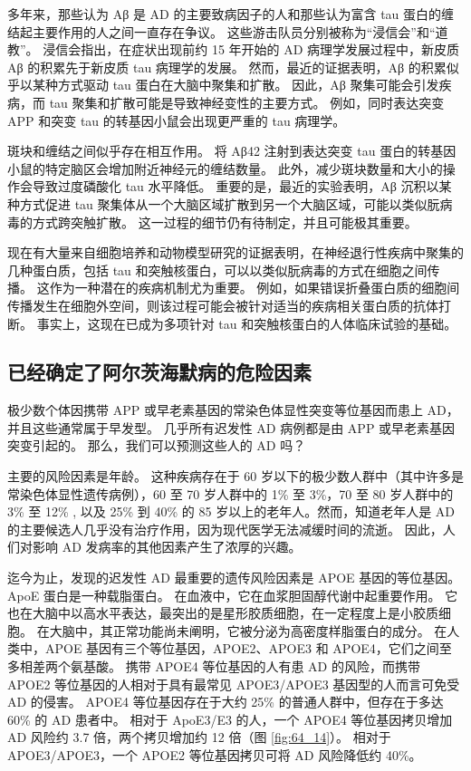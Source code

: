 多年来，那些认为 Aβ 是 AD 的主要致病因子的人和那些认为富含 tau 蛋白的缠结起主要作用的人之间一直存在争议。
这些游击队员分别被称为“浸信会”和“道教”。
浸信会指出，在症状出现前约 15 年开始的 AD 病理学发展过程中，新皮质 Aβ 的积累先于新皮质 tau 病理学的发展。
然而，最近的证据表明，Aβ 的积累似乎以某种方式驱动 tau 蛋白在大脑中聚集和扩散。
因此，Aβ 聚集可能会引发疾病，而 tau 聚集和扩散可能是导致神经变性的主要方式。
例如，同时表达突变 APP 和突变 tau 的转基因小鼠会出现更严重的 tau 病理学。


斑块和缠结之间似乎存在相互作用。
将 Aβ42 注射到表达突变 tau 蛋白的转基因小鼠的特定脑区会增加附近神经元的缠结数量。
此外，减少斑块数量和大小的操作会导致过度磷酸化 tau 水平降低。
重要的是，最近的实验表明，Aβ 沉积以某种方式促进 tau 聚集体从一个大脑区域扩散到另一个大脑区域，可能以类似朊病毒的方式跨突触扩散。
这一过程的细节仍有待制定，并且可能极其重要。


现在有大量来自细胞培养和动物模型研究的证据表明，在神经退行性疾病中聚集的几种蛋白质，包括 tau 和突触核蛋白，可以以类似朊病毒的方式在细胞之间传播。
这作为一种潜在的疾病机制尤为重要。
例如，如果错误折叠蛋白质的细胞间传播发生在细胞外空间，则该过程可能会被针对适当的疾病相关蛋白质的抗体打断。
事实上，这现在已成为多项针对 tau 和突触核蛋白的人体临床试验的基础。



\subsection{已经确定了阿尔茨海默病的危险因素}

极少数个体因携带 APP 或早老素基因的常染色体显性突变等位基因而患上 AD，并且这些通常属于早发型。
几乎所有迟发性 AD 病例都是由 APP 或早老素基因突变引起的。
那么，我们可以预测这些人的 AD 吗？


主要的风险因素是年龄。
这种疾病存在于 60 岁以下的极少数人群中（其中许多是常染色体显性遗传病例），60 至 70 岁人群中的 1\% 至 3\%，70 至 80 岁人群中的 3\% 至 12\% , 以及 25\% 到 40\% 的 85 岁以上的老年人。然而，知道老年人是 AD 的主要候选人几乎没有治疗作用，因为现代医学无法减缓时间的流逝。
因此，人们对影响 AD 发病率的其他因素产生了浓厚的兴趣。


迄今为止，发现的迟发性 AD 最重要的遗传风险因素是 APOE 基因的等位基因。
ApoE 蛋白是一种载脂蛋白。
在血液中，它在血浆胆固醇代谢中起重要作用。
它也在大脑中以高水平表达，最突出的是星形胶质细胞，在一定程度上是小胶质细胞。
在大脑中，其正常功能尚未阐明，它被分泌为高密度样脂蛋白的成分。
在人类中，APOE 基因有三个等位基因，APOE2、APOE3 和 APOE4，它们之间至多相差两个氨基酸。
携带 APOE4 等位基因的人有患 AD 的风险，而携带 APOE2 等位基因的人相对于具有最常见 APOE3/APOE3 基因型的人而言可免受 AD 的侵害。
APOE4 等位基因存在于大约 25\% 的普通人群中，但存在于多达 60\% 的 AD 患者中。
相对于 ApoE3/E3 的人，一个 APOE4 等位基因拷贝增加 AD 风险约 3.7 倍，两个拷贝增加约 12 倍（图 \ref{fig:64_14}）。
相对于 APOE3/APOE3，一个 APOE2 等位基因拷贝可将 AD 风险降低约 40\%。


